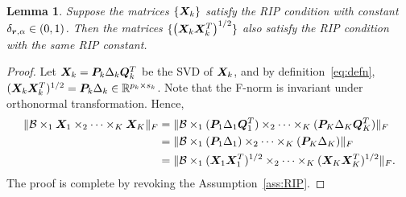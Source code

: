 \documentclass[11pt]{article}
\theoremstyle{plain}
\newtheorem{lem}{Lemma}
\theoremstyle{definition}
\begin{document}
\begin{lem}\label{lemma:RIP}
Suppose the matrices $\{\bm X_k\}$ satisfy the RIP condition with constant $\delta_{\bm{r},\alpha}\in(0,1)$. Then the matrices $\{ \left(\bm X_k\bm X^T_k\right)^{1/2}\}$ also satisfy the RIP condition with the same RIP constant. 
\end{lem}
\begin{proof}
Let $\bm X_k=\bm{P}_k\Delta_k \bm{Q}^T_k$ be the SVD of $\bm X_k$, and by definition~\ref{eq:defn}, $(\bm X_k\bm X^T_k)^{1/2}=\bm{P}_k\Delta_k\in\mathbb{R}^{p_k\times s_k}$. Note that the F-norm is invariant under orthonormal transformation. Hence,
\begin{align}
\lVert\mathcal{B}\times_1\bm X_1\times_2\cdots\times_K\bm X_K\rVert_F&=\lVert\mathcal{B}\times_1(\bm{P}_1\Delta_1\bm{Q}^T_1)\times_2\cdots\times_K(\bm{P}_K\Delta_K\bm{Q}^T_K)\rVert_F\\
&=\lVert\mathcal{B}\times_1 (\bm{P}_1\Delta_1)\times_2\cdots\times_K(\bm{P}_K\Delta_K)\rVert_F\\
&=\lVert\mathcal{B}\times_1 (\bm X_1\bm X^T_1)^{1/2}\times_2\cdots\times_K (\bm X_K\bm X^T_K)^{1/2} \rVert_F.
\end{align}
The proof is complete by revoking the Assumption~\ref{ass:RIP}.
\end{proof}
\end{document}
